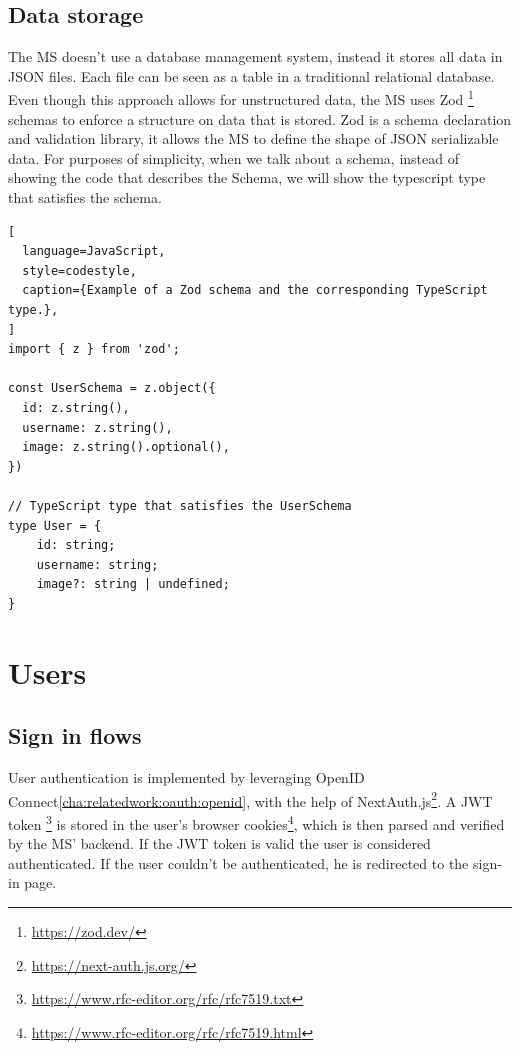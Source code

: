 \subsection{Data storage}
\label{cha:ms-architecture:data-storage}


The MS doesn't use a database management system, instead it stores all data in JSON files.
Each file can be seen as a table in a traditional relational database.
Even though this approach allows for unstructured data, the MS uses 
Zod \footnote{\url{https://zod.dev/}} schemas to enforce a structure on
data that is stored.
Zod is a schema declaration and validation library, it allows the MS to define the shape
of JSON serializable data.
For purposes of simplicity, when we talk about a schema, instead of showing the code that
describes the Schema, we will show the typescript type that satisfies the schema.

\begin{lstlisting}[
  language=JavaScript,
  style=codestyle,
  caption={Example of a Zod schema and the corresponding TypeScript type.},
]
import { z } from 'zod';

const UserSchema = z.object({
  id: z.string(),
  username: z.string(),
  image: z.string().optional(),
})

// TypeScript type that satisfies the UserSchema
type User = {
    id: string;
    username: string;
    image?: string | undefined;
}
\end{lstlisting}


\section{Users}


%

\subsection{Sign in flows}

User authentication is implemented by leveraging OpenID Connect\ref{cha:relatedwork:oauth:openid},
with the help of NextAuth.js\footnote{\url{https://next-auth.js.org/}}.
A JWT token \footnote{\url{https://www.rfc-editor.org/rfc/rfc7519.txt}}
is stored in the user's browser cookies\footnote{\url{https://www.rfc-editor.org/rfc/rfc7519.html}},
which is then parsed and verified by the MS' backend.
If the JWT token is valid the user is considered authenticated.
If the user couldn't be authenticated, he is redirected to the sign-in page.

